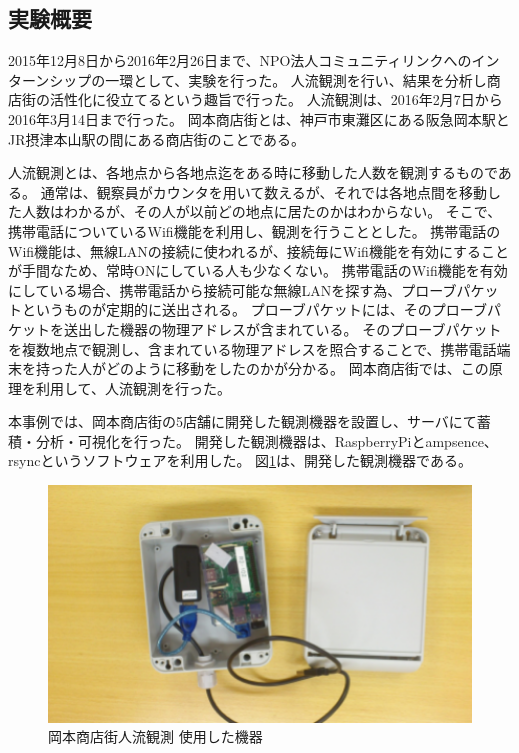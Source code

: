 

\subsection{実験概要}
2015年12月8日から2016年2月26日まで、NPO法人コミュニティリンクへのインターンシップの一環として、実験を行った。
人流観測を行い、結果を分析し商店街の活性化に役立てるという趣旨で行った。
人流観測は、2016年2月7日から2016年3月14日まで行った。
岡本商店街とは、神戸市東灘区にある阪急岡本駅とJR摂津本山駅の間にある商店街のことである。

人流観測とは、各地点から各地点迄をある時に移動した人数を観測するものである。
通常は、観察員がカウンタを用いて数えるが、それでは各地点間を移動した人数はわかるが、その人が以前どの地点に居たのかはわからない。
そこで、携帯電話についているWifi機能を利用し、観測を行うこととした。
携帯電話のWifi機能は、無線LANの接続に使われるが、接続毎にWifi機能を有効にすることが手間なため、常時ONにしている人も少なくない。
携帯電話のWifi機能を有効にしている場合、携帯電話から接続可能な無線LANを探す為、プローブパケットというものが定期的に送出される。
プローブパケットには、そのプローブパケットを送出した機器の物理アドレスが含まれている。
そのプローブパケットを複数地点で観測し、含まれている物理アドレスを照合することで、携帯電話端末を持った人がどのように移動をしたのかが分かる。
岡本商店街では、この原理を利用して、人流観測を行った。

本事例では、岡本商店街の5店舗に開発した観測機器を設置し、サーバにて蓄積・分析・可視化を行った。
開発した観測機器は、RaspberryPiとampsence、rsyncというソフトウェアを利用した。
図\ref{fig:okamoto_pict1}は、開発した観測機器である。
\begin{figure}[htbp]
\includegraphics[width=16cm]{images/okamoto_pict1.png}
\caption{岡本商店街人流観測 使用した機器}
\label{fig:okamoto_pict1}
\end{figure}

